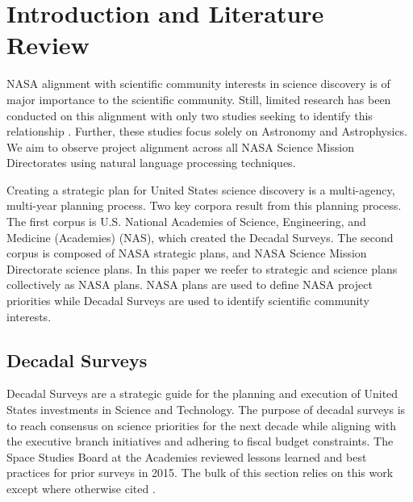 \documentclass[preprint,12pt]{elsarticle}
\begin{document}


\section{Introduction and Literature Review}


NASA alignment with scientific community interests in science discovery is of major importance to the scientific community. Still, limited research has been conducted on this alignment with only two studies seeking to identify this relationship \cite{Trimble2011} \cite {pan2023seven_decadals}. Further, these studies focus solely on Astronomy and Astrophysics. We aim to observe project alignment across all NASA Science Mission Directorates using natural language processing techniques. 

Creating a strategic plan for United States science discovery is a multi-agency, multi-year planning process. Two key corpora result from this planning process. The first corpus is U.S. National Academies of Science, Engineering, and Medicine (Academies) (NAS), which created the Decadal Surveys. The second corpus is composed of NASA strategic plans, and NASA Science Mission Directorate science plans. In this paper we reefer to strategic and science plans collectively as NASA plans. NASA plans are used to define NASA project priorities while Decadal Surveys are used to identify scientific community interests.

\subsection{Decadal Surveys}


Decadal Surveys are a strategic guide for the planning and execution of United States investments in Science and Technology. \cite{}The purpose of decadal surveys is to reach consensus on science priorities for the next decade while aligning with the executive branch initiatives and adhering to fiscal budget constraints. The Space Studies Board at the Academies reviewed lessons learned and best practices for prior surveys in 2015. The bulk of this section relies on this work except where otherwise cited \cite{Academies2015_lessons}.
\end{document}
